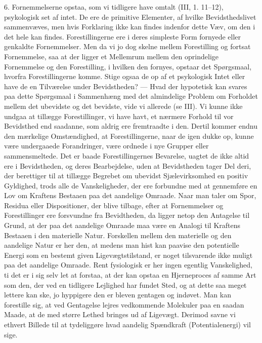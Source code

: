 \documentclass[12pt,a4paper,openany]{book}
\newcommand{\opage}[1]{\marginnote{\footnotesize\textit{[#1]}}}
\begin{document}
6. Fornemmelserne opstaa, som vi tidligere have omtalt (III, 1. 11--12),
psykologisk set af intet. De ere de primitive Elementer, af hvilke
Bevidsthedslivet sammenvæves, men hvis Forklaring ikke kan findes
indenfor dette Væv, om den i det hele kan findes. Forestillingerne ere i
deres simpleste Form fornyede eller genkaldte Fornemmelser. Men da vi jo
dog skelne mellem Forestilling og fortsat Fornemmelse, saa at der ligger
et Mellemrum mellem den oprindelige Fornemmelse og den Forestilling, i
hvilken den fornyes, opstaar det Spørgsmaal, hvorfra Forestillingerne
komme. Stige ogsaa de op af et psykologisk Intet eller have de en
Tilværelse under Bevidstheden? --- Hvad der hypotetisk kan svares paa
dette Spørgsmaal i Sammenhæng med det almindelige Problem om Forholdet
mellem det ubevidste og det bevidste, vide vi allerede (se III). Vi
kunne ikke undgaa at tillægge Forestillinger, vi have havt, et nærmere
Forhold til vor Bevidsthed end saadanne, som aldrig ere fremtraadte i
den. Dertil kommer endnu den mærkelige Omstændighed, at
Forestillingerne, naar de igen dukke op, kunne være undergaaede
Forandringer, være ordnede i nye Grupper eller sammensmeltede. Det er
baade Forestillingernes Bevarelse, uagtet de ikke altid ere i
Bevidstheden, og deres Bearbejdelse, uden at Bevidstheden tager Del
deri, der berettiger til at tillægge Begrebet om ubevidst
Sjælevirksomhed en positiv Gyldighed, trods alle de Vanskeligheder, der
ere forbundne med at gennemføre en Lov om Kraftens Bestaaen paa det
aandelige Omraade. Naar man taler om Spor, Residua eller Dispositioner,
der blive tilbage, efter at Fornemmelser og Forestillinger ere
forsvundne fra Bevidtheden, da ligger netop den Antagelse til Grund, at
der paa det aandelige Omraade maa være en Analogi til Kraftens Bestaaen
i den materielle Natur. Forskellen mellem den materielle og den
aandelige Natur er her den, at medens man hist kan paavise den
potentielle Energi som en bestemt given Ligevægtstilstand, er noget
tilsvarende ikke muligt paa det aandelige
\opage{173}Omraade. Rent fysiologisk er her ingen egentlig Vanskelighed,
ti det er i sig selv let at forstaa, at der kan opstaa en Hjerneproces
af samme Art som den, der ved en tidligere Lejlighed har fundet Sted, og
at dette saa meget lettere kan ske, jo hyppigere den er bleven gentagen
og indøvet. Man kan forestille sig, at ved Gentagelse lejres vedkommende
Molekuler paa en saadan Maade, at de med større Lethed bringes ud af
Ligevægt. Derimod savne vi ethvert Billede til at tydeliggøre hvad
aandelig Spændkraft (Potentialenergi) vil sige.
\end{document}
